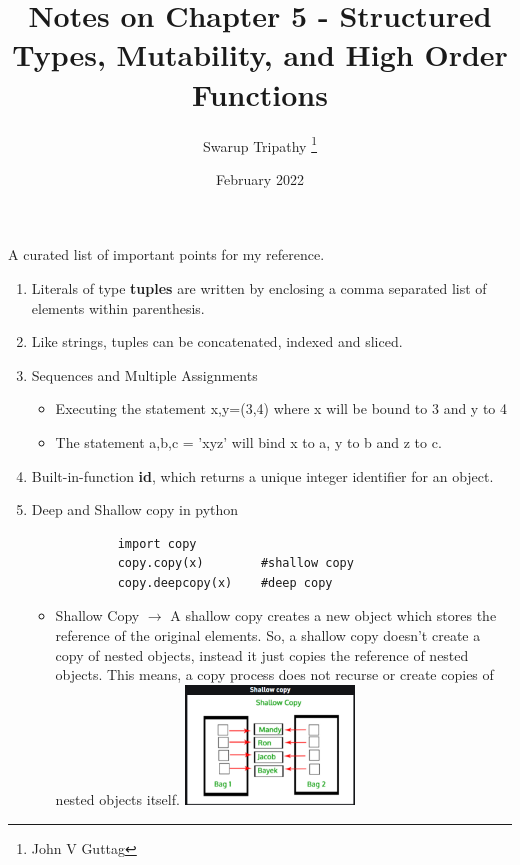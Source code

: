 \documentclass[11pt]{article}
\title{Notes on Chapter 5 - Structured Types, Mutability, and High Order Functions}
\author{Swarup Tripathy \thanks{John V Guttag}}
\date{February 2022}
\begin{document}
    \maketitle
    A curated list of important points for my reference.\\
    \begin{enumerate}
        \item Literals of type \textbf{tuples} are written by enclosing a comma separated list of elements within parenthesis.
        \item Like strings, tuples can be concatenated, indexed and sliced.
        \item Sequences and Multiple Assignments
        \begin{itemize}
            \item Executing the statement x,y=(3,4) where x will be bound to 3 and y to 4
            \item The statement a,b,c = 'xyz' will bind x to a, y to b and z to c.
        \end{itemize}
        \item Built-in-function \textbf{id}, which returns a unique integer identifier for an object.
        \item Deep and Shallow copy in python
        \begin{verbatim}
            import copy
            copy.copy(x)        #shallow copy
            copy.deepcopy(x)    #deep copy
        \end{verbatim}
        \begin{itemize}
            \item Shallow Copy $\rightarrow$ A shallow copy creates a new object which stores the reference of the original elements.
            So, a shallow copy doesn't create a copy of nested objects, instead it just copies the reference of nested objects. This means, a copy process does not recurse or create copies of nested objects itself.
            \centering
            \includegraphics[width=4.5cm]{imgs/2.png}


\end{itemize}
\end{enumerate}
\end{document}
